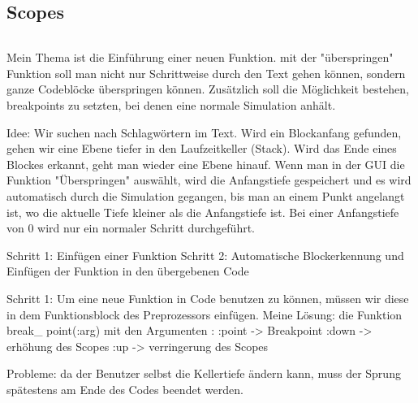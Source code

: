 \subsection{Scopes}


\begin{frame}
\inputminted[linenos, numbersep=5pt, tabsize=4, frame=lines, label=Othello.java]{java}{scopes/first.rb}
\end{frame}


\begin{frame}
Mein Thema ist die Einführung einer neuen Funktion. mit der "überspringen" Funktion soll man nicht nur Schrittweise durch den Text gehen können, sondern ganze Codeblöcke überspringen können. Zusätzlich soll die Möglichkeit bestehen, breakpoints zu setzten, bei denen eine normale Simulation anhält. 
\end{frame}

\begin{frame}
Idee: Wir suchen nach Schlagwörtern im Text. Wird ein Blockanfang gefunden, gehen wir eine Ebene tiefer in den Laufzeitkeller (Stack). Wird das Ende eines Blockes erkannt, geht man wieder eine Ebene hinauf. Wenn man in der GUI die Funktion "Überspringen" auswählt, wird die Anfangstiefe gespeichert und es wird automatisch durch die Simulation gegangen, bis man an einem Punkt angelangt ist, wo die aktuelle Tiefe kleiner als die Anfangstiefe ist. Bei einer Anfangstiefe von 0 wird nur ein normaler Schritt durchgeführt.
\end{frame}

\begin{frame}
Schritt 1: Einfügen einer Funktion
Schritt 2: Automatische Blockerkennung und Einfügen der Funktion in den übergebenen Code
\end{frame}

\begin{frame}
Schritt 1: 
Um eine neue Funktion in Code benutzen zu können, müssen wir diese in dem Funktionsblock des Preprozessors einfügen.
Meine Lösung: die Funktion break\_ point(:arg) mit den Argumenten :
:point -> Breakpoint
:down -> erhöhung des Scopes
:up -> verringerung des Scopes
\end{frame}

\begin{frame}
Probleme:
da der Benutzer selbst die Kellertiefe ändern kann, muss der Sprung spätestens am Ende des Codes beendet werden.
\end{frame}